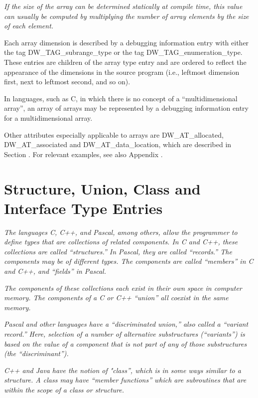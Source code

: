 \textit{If the size of the array can be determined statically at
compile time, this value can usually be computed by multiplying
the number of array elements by the size of each element.}


Each array dimension is described by a debugging information
entry with either the tag DW\_TAG\_subrange\_type or the tag
DW\_TAG\_enumeration\_type. These entries are children of the
array type entry and are ordered to reflect the appearance of
the dimensions in the source program (i.e., leftmost dimension
first, next to leftmost second, and so on).

In languages, such as C, in which there is no concept of
a “multidimensional array”, an array of arrays may
be represented by a debugging information entry for a
multidimensional array.

Other attributes especially applicable to arrays are
DW\_AT\_allocated, DW\_AT\_associated and DW\_AT\_data\_location,
which are described in 
Section . 
For relevant examples,
see also 
Appendix .

\section{ Structure, Union, Class and Interface Type Entries}
\label{chap:structureunionclassandinterfacetypeentries}

\textit{The languages C, C++, and Pascal, among others, allow the
programmer to define types that are collections of related
components. In C and C++, these collections are called
“structures.” In Pascal, they are called “records.”
The components may be of different types. The components are
called “members” in C and C++, and “fields” in Pascal.}

\textit{The components of these collections each exist in their
own space in computer memory. The components of a C or C++
“union” all coexist in the same memory.}

\textit{Pascal and other languages have a “discriminated union,”
also called a “variant record.” Here, selection of a
number of alternative substructures (“variants”) is based
on the value of a component that is not part of any of those
substructures (the “discriminant”).}

\textit{C++ and Java have the notion of "class”, which is in some
ways similar to a structure. A class may have “member
functions” which are subroutines that are within the scope
of a class or structure.}

